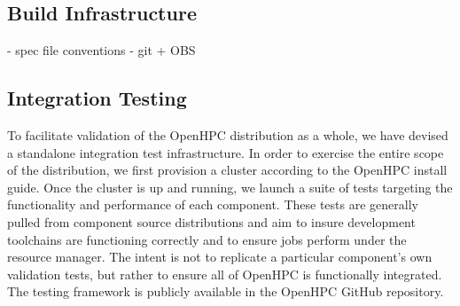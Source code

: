 \documentclass{sig-alternate-05-2015}
\begin{document}




\subsection{Build Infrastructure}

 - spec file conventions
 - git + OBS
 
\subsection{Integration Testing} \label{sec:integ_testing}
To facilitate validation of the OpenHPC distribution as a whole, we have 
devised a standalone integration test infrastructure. In order to exercise the
entire scope of the distribution, we first provision a cluster according to the
OpenHPC install guide. Once the cluster is up and running, we launch a suite of 
tests targeting the functionality and performance of each component. These tests 
are generally pulled from component source distributions and aim to insure 
development toolchains are functioning correctly and to ensure jobs perform 
under the resource manager. The intent is not to replicate a particular 
component's own validation tests, but rather to ensure all of OpenHPC is
functionally integrated. The testing framework is publicly available in the
OpenHPC GitHub repository.
\end{document}

